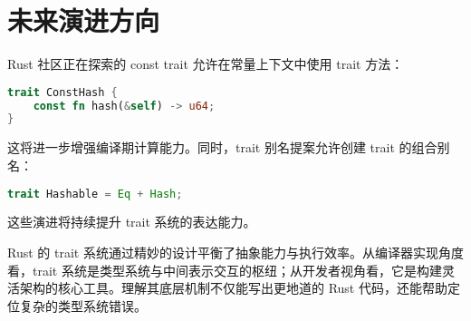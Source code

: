 \chapter{未来演进方向}
Rust 社区正在探索的 const trait 允许在常量上下文中使用 trait 方法：\par
\begin{lstlisting}[language=rust]
trait ConstHash {
    const fn hash(&self) -> u64;
}
\end{lstlisting}
这将进一步增强编译期计算能力。同时，trait 别名提案允许创建 trait 的组合别名：\par
\begin{lstlisting}[language=rust]
trait Hashable = Eq + Hash;
\end{lstlisting}
这些演进将持续提升 trait 系统的表达能力。\par
Rust 的 trait 系统通过精妙的设计平衡了抽象能力与执行效率。从编译器实现角度看，trait 系统是类型系统与中间表示交互的枢纽；从开发者视角看，它是构建灵活架构的核心工具。理解其底层机制不仅能写出更地道的 Rust 代码，还能帮助定位复杂的类型系统错误。\par

